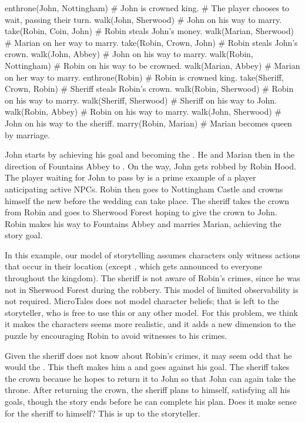 \documentclass{nilreport}
\begin{document}
\begin{code}
enthrone(John, Nottingham)  # John is crowned king.
# The player chooses to wait, passing their turn.
walk(John, Sherwood)        # John on his way to marry.
take(Robin, Coin, John)     # Robin steals John's money.
walk(Marian, Sherwood)      # Marian on her way to marry.
take(Robin, Crown, John)    # Robin steals John's crown.
walk(John, Abbey)           # John on his way to marry.
walk(Robin, Nottingham)     # Robin on his way to be crowned.
walk(Marian, Abbey)         # Marian on her way to marry.
enthrone(Robin)             # Robin is crowned king.
take(Sheriff, Crown, Robin) # Sheriff steals Robin's crown.
walk(Robin, Sherwood)       # Robin on his way to marry.
walk(Sheriff, Sherwood)     # Sheriff on his way to John.
walk(Robin, Abbey)          # Robin on his way to marry.
walk(John, Sherwood)        # John on his way to the sheriff.
marry(Robin, Marian)        # Marian becomes queen by marriage.
\end{code}

John starts by achieving his  goal and becoming the . He and Marian then  in the direction of Fountains Abbey to . On the way, John gets robbed by Robin Hood. The player waiting for John to pass by is a prime example of a player anticipating active NPCs. Robin then goes to Nottingham Castle and crowns himself the new  before the wedding can take place. The sheriff takes the crown from Robin and goes to Sherwood Forest hoping to give the crown to John. Robin makes his way to Fountains Abbey and marries Marian, achieving the story goal.

In this example, our model of storytelling assumes characters only witness actions that occur in their location (except , which gets announced to everyone throughout the kingdom). The sheriff is not aware of Robin's crimes, since he was not in Sherwood Forest during the robbery. This model of limited observability is not required. MicroTales does not model character beliefs; that is left to the storyteller, who is free to use this or any other model. For this problem, we think it makes the characters seems more realistic, and it adds a new dimension to the puzzle by encouraging Robin to avoid witnesses to his crimes.

Given the sheriff does not know about Robin's crimes, it may seem odd that he would  the . This theft makes him a  and goes against his  goal. The sheriff takes the crown because he hopes to return it to John so that John can again take the throne. After returning the crown, the sheriff plans to  himself, satisfying all his goals, though the story ends before he can complete his plan. Does it make sense for the sheriff to  himself? This is up to the storyteller.
\end{document}
